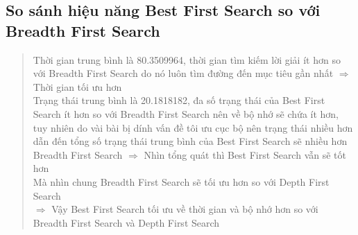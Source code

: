 \documentclass[a4paper]{article}
\begin{document}
\subsection{So sánh hiệu năng Best First Search so với Breadth First Search}
\begin{flushleft}
	\hspace{1 cm}
	\begin{quotation}
		\textbullet \hspace{0.25 cm} Thời gian trung bình là 80.3509964, thời gian tìm kiếm lời giải ít hơn so với Breadth First Search do nó luôn tìm đường đến mục tiêu gần nhất $\Rightarrow$ Thời gian tối ưu hơn \\
		\textbullet	\hspace{0.25 cm}	Trạng thái trung bình là 20.1818182, đa số trạng thái của Best First Search ít hơn so với Breadth First Search nên về bộ nhớ sẽ chứa ít hơn, tuy nhiên do vài bài bị dính vấn đề tôi ưu cục bộ nên trạng thái nhiều hơn dẫn đến tổng số trạng thái trung bình của Best First Search sẽ nhiều hơn Breadth First Search $\Rightarrow$ Nhìn tổng quát thì Best First Search vẫn sẽ tốt hơn\\
		\textbullet \hspace{0.25 cm} Mà nhìn chung Breadth First Search sẽ tối ưu hơn so với Depth First Search\\
		$\Rightarrow$ Vậy Best First Search tối ưu về thời gian và bộ nhớ hơn so với Breadth First Search và Depth First Search
	\end{quotation}	
\end{flushleft}
\end{document}
